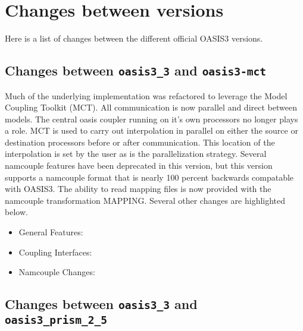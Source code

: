 \newpage

\chapter{Changes between versions}
\label{sec_changes}

Here is a list of changes between the different official OASIS3
versions.

\section{Changes between {\tt oasis3\_3} and {\tt oasis3-mct}}

Much of the underlying implementation was refactored to leverage
the Model Coupling Toolkit (MCT).  All communication is now parallel
and direct between models.  The central oasis coupler running
on it's own processors no longer plays a role.  MCT is used to
carry out interpolation in parallel on either the source or destination
processors before or after communication.  This location of the
interpolation is set by the user as is the parallelization strategy.  
Several namcouple features have been
deprecated in this version, but this version supports a namcouple
format that is nearly 100 percent backwards compatable with OASIS3.
The ability to read mapping files is now provided with the namcouple
transformation MAPPING.  Several other changes are highlighted below.

\begin{itemize}

\item General Features:

%

\item Coupling Interfaces:

%

\item Namcouple Changes:

%

\end{itemize}


\section{Changes between {\tt oasis3\_3} and {\tt
oasis3\_prism\_2\_5}}

